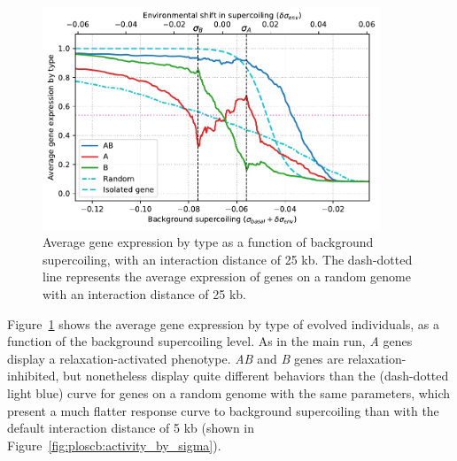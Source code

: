 \begin{figure}[H]
\centering
\includegraphics[width=0.9\textwidth]{param/interaction-25k/activity_sigmas_avg.pdf}
\caption[Average gene expression as a function of background supercoiling, with an interaction distance of 25 kb]{Average gene expression by type as a function of background supercoiling, with an interaction distance of 25 kb.
The dash-dotted line represents the average expression of genes on a random genome with an interaction distance of 25 kb.}
\label{fig:param:inter25k-activ-by-sigma}
\end{figure}

Figure~\ref{fig:param:inter25k-activ-by-sigma} shows the average gene expression by type of evolved individuals, as a function of the background supercoiling level.
As in the main run, \emph{A} genes display a relaxation-activated phenotype.
\emph{AB} and \emph{B} genes are relaxation-inhibited, but nonetheless display quite different behaviors than the (dash-dotted light blue) curve for genes on a random genome with the same parameters, which present a much flatter response curve to background supercoiling than with the default interaction distance of 5 kb (shown in Figure~\ref{fig:ploscb:activity_by_sigma}).

